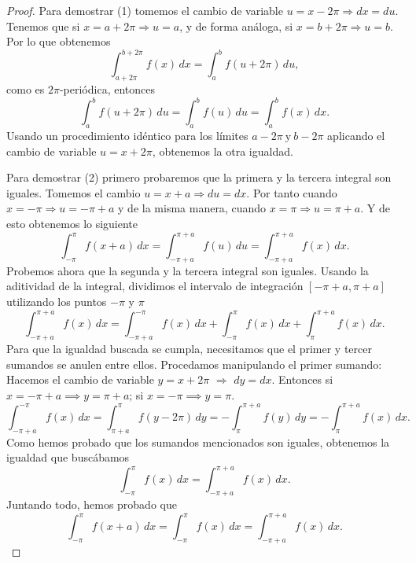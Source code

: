 \documentclass[12pt]{article}
\theoremstyle{plain}
\theoremstyle{definition}
\numberwithin{equation}{section}
\begin{document}
        \begin{proof}
            Para demostrar (1) tomemos el cambio de variable \(u = x-2\pi \Rightarrow dx = du\).
            Tenemos que si \(x = a+2\pi \Rightarrow u = a\), y de forma análoga, si \(x = b+2\pi \Rightarrow u = b\). Por lo que obtenemos
            \begin{equation*}
                \int_{a+2\pi}^{b+2\pi} f(x) \,dx = \int_{a}^{b} f(u+2\pi) \,du,
            \end{equation*}
            como es \(2\pi\)-periódica, entonces
            \begin{equation*}
                \int_{a}^{b} f(u+2\pi) \,du = \int_{a}^{b} f(u) \,du = \int_{a}^{b} f(x) \,dx.
            \end{equation*}
            Usando un procedimiento idéntico para los límites \(a-2\pi\ \text{y}\ b-2\pi\) aplicando el cambio de variable \(u = x+2\pi\), obtenemos la otra igualdad.

            Para demostrar (2) primero probaremos que la primera y la tercera integral son iguales. Tomemos el cambio \(u = x + a \Rightarrow du = dx\). 
            Por tanto cuando \(x = -\pi \Rightarrow u = -\pi + a\) y de la misma manera, cuando \(x = \pi \Rightarrow u = \pi + a\). Y de esto obtenemos lo siguiente
            \begin{equation*}
                \int_{-\pi}^{\pi} f(x+a) \,dx = \int_{-\pi+a}^{\pi+a} f(u) \,du = \int_{-\pi+a}^{\pi+a} f(x) \,dx.
            \end{equation*}
            Probemos ahora que la segunda y la tercera integral son iguales. Usando la aditividad de la integral, dividimos el intervalo de integración \([-\pi+a,\pi+a]\) utilizando los puntos \(-\pi\) y \(\pi\)
            \begin{equation*}
                \int_{-\pi+a}^{\pi+a} f(x) \,dx = \int_{-\pi+a}^{-\pi} f(x) \,dx + \int_{-\pi}^{\pi} f(x) \,dx + \int_{\pi}^{\pi+a} f(x) \,dx.
            \end{equation*}
            Para que la igualdad buscada se cumpla, necesitamos que el primer y tercer sumandos se anulen entre ellos. Procedamos manipulando el primer sumando:
            Hacemos el cambio de variable $y = x + 2\pi$ \(\Rightarrow\) $dy = dx$.
            Entonces si $x = -\pi+a \implies y = \pi+a$; si $x = -\pi \implies y = \pi$.
            $$\int_{-\pi+a}^{-\pi} f(x)\,dx = \int_{\pi+a}^{\pi} f(y - 2\pi)\,dy = - \int_{\pi}^{\pi+a} f(y)\,dy = - \int_{\pi}^{\pi+a} f(x)\,dx.$$ 
            Como hemos probado que los sumandos mencionados son iguales, obtenemos la igualdad que buscábamos
            $$\int_{-\pi}^{\pi} f(x) \,dx = \int_{-\pi+a}^{\pi+a} f(x) \,dx.$$
            Juntando todo, hemos probado que
            $$\int_{-\pi}^{\pi} f(x+a) \,dx = \int_{-\pi}^{\pi} f(x) \,dx = \int_{-\pi+a}^{\pi+a} f(x) \,dx.$$
        \end{proof}
\end{document}
